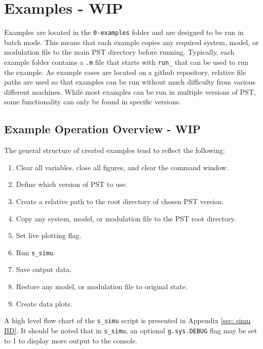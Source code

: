 \chapter{Examples - WIP}
Examples are located in the \verb|0-examples| folder and are designed to be run in batch mode.
This means that each example copies any required system, model, or modulation file to the main PST directory before running.
Typically, each example folder contains a \verb|.m| file that starts with \verb|run_| that can be used to run the example.
As example cases are located on a github repository, relative file paths are used so that examples can be run without much difficulty from various different machines.
While most examples can be run in multiple versions of PST, some functionality can only be found in specific versions.


\section{Example Operation Overview - WIP}

\noindent The general structure of created examples tend to reflect the following:
\begin{enumerate}
\itemsep 0em
\item Clear all variables, close all figures, and clear the command window.
\item Define which version of PST to use.
\item Create a relative path to the root directory of chosen PST version.
\item Copy any system, model, or modulation file to the PST root directory.
\item Set live plotting flag.
\item Run \verb|s_simu|.
\item Save output data.
\item Restore any model, or modulation file to original state.
\item Create data plots.
\end{enumerate}

A high level flow chart of the \verb|s_simu| script is presented in Appendix \ref{sec: simu BD}.
It should be noted that in \verb|s_simu|, an optional \verb|g.sys.DEBUG| flag may be set to 1 to display more output to the console.



